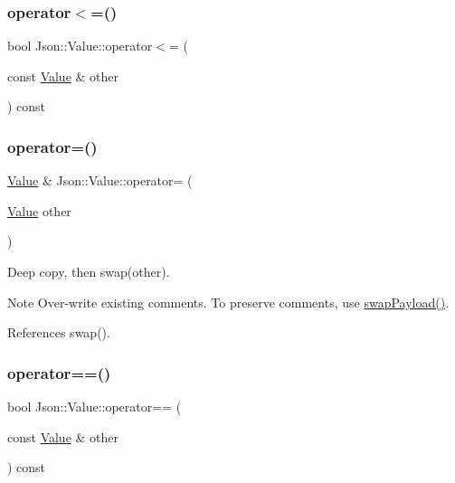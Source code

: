 \mbox{\label{classJson_1_1Value_a40c411a320a416d5eac0052b36211286_a40c411a320a416d5eac0052b36211286}} 
\subsubsection{\texorpdfstring{operator$<$=()}{operator<=()}}
{\footnotesize\ttfamily bool Json\+::\+Value\+::operator$<$= (\begin{DoxyParamCaption}\item[{const \hyperlink{classJson_1_1Value}{Value} \&}]{other }\end{DoxyParamCaption}) const}

\mbox{\label{classJson_1_1Value_a795acb28772da4c5d85ae8f4af36c69f_a795acb28772da4c5d85ae8f4af36c69f}} 
\subsubsection{\texorpdfstring{operator=()}{operator=()}}
{\footnotesize\ttfamily \hyperlink{classJson_1_1Value}{Value} \& Json\+::\+Value\+::operator= (\begin{DoxyParamCaption}\item[{\hyperlink{classJson_1_1Value}{Value}}]{other }\end{DoxyParamCaption})}

Deep copy, then swap(other). \begin{DoxyNote}{Note}
Over-\/write existing comments. To preserve comments, use \hyperlink{classJson_1_1Value_a5263476047f20e2fc6de470e4de34fe5_a5263476047f20e2fc6de470e4de34fe5}{swap\+Payload()}. 
\end{DoxyNote}


References swap().

\mbox{\label{classJson_1_1Value_a16f9250e30d5c4505cd11137c564a764_a16f9250e30d5c4505cd11137c564a764}} 
\subsubsection{\texorpdfstring{operator==()}{operator==()}}
{\footnotesize\ttfamily bool Json\+::\+Value\+::operator== (\begin{DoxyParamCaption}\item[{const \hyperlink{classJson_1_1Value}{Value} \&}]{other }\end{DoxyParamCaption}) const}



